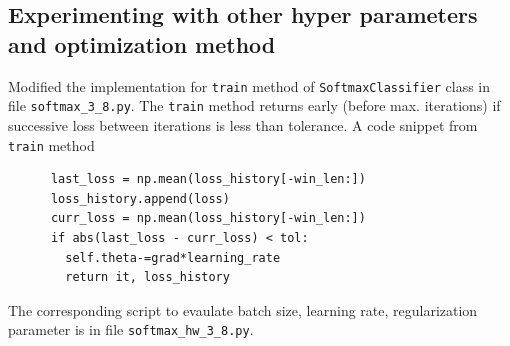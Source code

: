 \documentclass{article}
\begin{document}
\subsection{Experimenting with other hyper parameters and optimization method}
Modified the implementation for \verb|train| method of \verb|SoftmaxClassifier| class in file \verb|softmax_3_8.py|.
The \verb|train| method returns early (before max. iterations) if successive loss between iterations is less than tolerance.
A code snippet from \verb|train| method
\begin{small}
\begin{lstlisting}
      last_loss = np.mean(loss_history[-win_len:])
      loss_history.append(loss)
      curr_loss = np.mean(loss_history[-win_len:])
      if abs(last_loss - curr_loss) < tol:
        self.theta-=grad*learning_rate
        return it, loss_history
\end{lstlisting}
\end{small}
The corresponding script to evaulate batch size, learning rate, regularization parameter is in file \verb|softmax_hw_3_8.py|.
\end{document}

